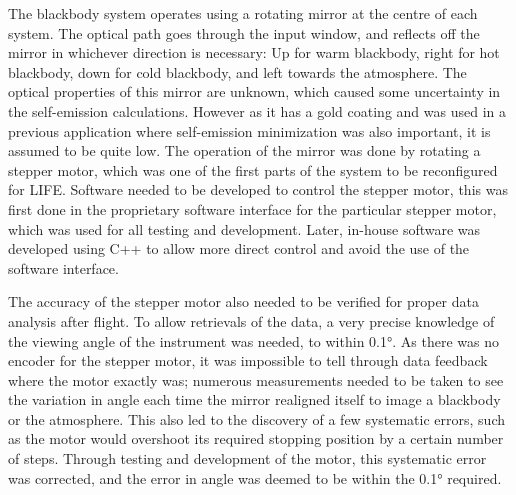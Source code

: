 The blackbody system operates using a rotating mirror at the centre of each system. The optical path goes through the input window, and reflects off the mirror in whichever direction is necessary: Up for warm blackbody, right for hot blackbody, down for cold blackbody, and left towards the atmosphere. The optical properties of this mirror are unknown, which caused some uncertainty in the self-emission calculations. However as it has a gold coating and was used in a previous application where self-emission minimization was also important, it is assumed to be quite low. The operation of the mirror was done by rotating a stepper motor, which was one of the first parts of the system to be reconfigured for LIFE. Software needed to be developed to control the stepper motor, this was first done in the proprietary software interface for the particular stepper motor, which was used for all testing and development. Later, in-house software was developed using C++ to allow more direct control and avoid the use of the software interface. 

The accuracy of the stepper motor also needed to be verified for proper data analysis after flight. To allow retrievals of the data, a very precise knowledge of the viewing angle of the instrument was needed, to within 0.1°. As there was no encoder for the stepper motor, it was impossible to tell through data feedback where the motor exactly was; numerous measurements needed to be taken to see the variation in angle each time the mirror realigned itself to image a blackbody or the atmosphere. This also led to the discovery of a few systematic errors, such as the motor would overshoot its required stopping position by a certain number of steps. Through testing and development of the motor, this systematic error was corrected, and the error in angle was deemed to be within the 0.1° required.

